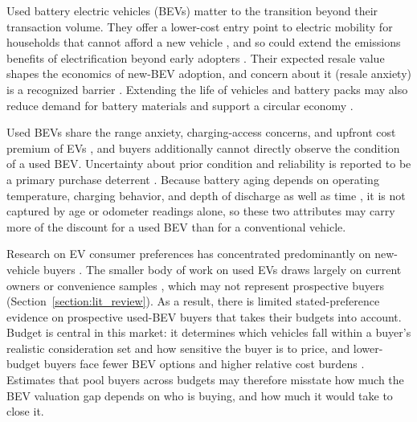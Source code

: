 \documentclass[a4paper,fleqn]{cas-sc}   %
\begin{document}
Used battery electric vehicles (BEVs) matter to the transition beyond their transaction volume. They offer a lower-cost entry point to electric mobility for households that cannot afford a new vehicle \parencite{canepaEarlyLookPlugin2019, hagmanTotalCostOwnership2016, sheykhfardAnalyzingPurchaseIntentions2025}, and so could extend the emissions benefits of electrification beyond early adopters \parencite{sheykhfardAnalyzingPurchaseIntentions2025, trd2024usedEV_concerns, tandf2025usedEV}. Their expected resale value shapes the economics of new-BEV adoption, and concern about it (resale anxiety) is a recognized barrier \parencite{bruckmannResaleAnxietyObstacle2021, limMassAdoptionElectric2015}. Extending the life of vehicles and battery packs may also reduce demand for battery materials and support a circular economy \parencite{guzekElectricVehiclesOverview2024, husterConsumersWantReconditioned2024, shaikhSystemDynamicsCosting2023}.

Used BEVs share the range anxiety, charging-access concerns, and upfront cost premium of EVs \parencite{sheykhfardAnalyzingPurchaseIntentions2025}, and buyers additionally cannot directly observe the condition of a used BEV. Uncertainty about prior condition and reliability is reported to be a primary purchase deterrent \parencite{fernandesUSUnderstandingConsumer2023}. Because battery aging depends on operating temperature, charging behavior, and depth of discharge as well as time \parencite{guzekElectricVehiclesOverview2024}, it is not captured by age or odometer readings alone, so these two attributes may carry more of the discount for a used BEV than for a conventional vehicle.

Research on EV consumer preferences has concentrated predominantly on new-vehicle buyers \parencite{sheykhfardAnalyzingPurchaseIntentions2025, tandf2025usedEV}. The smaller body of work on used EVs draws largely on current owners or convenience samples \parencite{trd2024usedEV_concerns, sheykhfardAnalyzingPurchaseIntentions2025}, which may not represent prospective buyers (Section~\ref{section:lit_review}). As a result, there is limited stated-preference evidence on prospective used-BEV buyers that takes their budgets into account. Budget is central in this market: it determines which vehicles fall within a buyer's realistic consideration set and how sensitive the buyer is to price, and lower-budget buyers face fewer BEV options and higher relative cost burdens \parencite{konstantinou2024usedEV_price, trd2024usedEV_concerns}. Estimates that pool buyers across budgets may therefore misstate how much the BEV valuation gap depends on who is buying, and how much it would take to close it.
\end{document}
